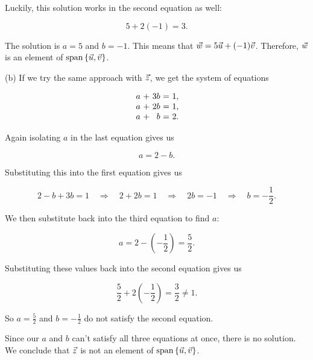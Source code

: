 \documentclass{ximera}
\begin{document}
\begin{exploration}
\begin{example}
\begin{solution}
    Luckily, this solution works in the second equation as well:

    \begin{equation*}
      5 + 2(-1) = 3.
    \end{equation*}
  
    The solution is $a=5$ and $b=-1$. This means that
    $\vec{w} = 5\vec{u} + (-1)\vec{v}$. Therefore, $\vec{w}$ is an
    element of $\text{span}\left\{\vec{u},\vec{v}\right\}$.
  
    (b) If we try the same approach with $\vec{z}$, we get the system of equations
  
    \begin{equation*}
      \begin{array}{r@{~}c@{~}r@{~}c@{~}r@{~}r}
        a & + & 3b & = & 1, \\
        a & + & 2b & = & 1, \\
        a & + & b & = & 2.
      \end{array}
    \end{equation*}

    Again isolating $a$ in the last equation gives us

    \begin{equation*}
      a = 2 - b.
    \end{equation*}

    Substituting this into the first equation gives us

    \begin{equation*}
      2 - b + 3b = 1 \quad \Rightarrow \quad 2 + 2b = 1 \quad \Rightarrow \quad 2b = -1 \quad \Rightarrow \quad b = -\frac{1}{2}.
    \end{equation*}

    We then substitute back into the third equation to find $a$:

    \begin{equation*}
      a = 2 - \left(-\frac{1}{2}\right) = \frac{5}{2}.
    \end{equation*}

    Substituting these values back into the second equation gives us

    \begin{equation*}
      \frac{5}{2} + 2\left(-\frac{1}{2}\right) = \frac{3}{2}\neq 1.
    \end{equation*}

    So $a=\frac{5}{2}$ and $b=-\frac{1}{2}$ do not satisfy the second equation.

    Since our $a$ and $b$ can't satisfy all three equations at once, there is no solution. We conclude
    that $\vec{z}$ is not an element of
    $\text{span}\left\{\vec{u},\vec{v}\right\}$.
  \end{solution}


\end{example}
\end{exploration}
\end{document}
